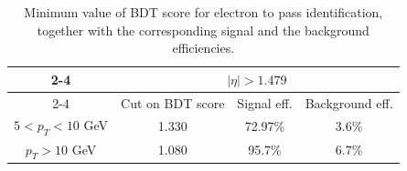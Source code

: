 \begin{table}[h!]
\begin{tabular}{|c|c c c}
\cline{2-4}
  \multicolumn{1}{ c|}{}             & \multicolumn{3}{|c|}{$|\eta| > 1.479$}                        \\            
\cline{2-4} %
   \multicolumn{1}{c|}{}            & Cut on BDT score & Signal eff. & \multicolumn{1}{c|}{Background eff.}  \\
\hline  %
$ 5 < p_T < 10 $ GeV              & 1.330                     & 72.97\%    &  \multicolumn{1}{c|}{3.6\%}     \\
\hline %
$p_T > 10$ GeV                      &  1.080		         & 95.7\%      &  \multicolumn{1}{c|}{6.7\%}		\\
\hline %

     \end{tabular}
\small
    \caption{Minimum value of BDT score for electron to pass identification, together with the corresponding signal and the background efficiencies.}%
    \label{tab:ele_ID_WP}
\end{table}
